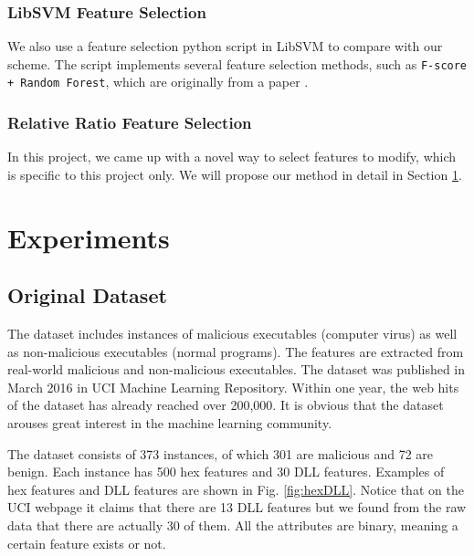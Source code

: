 \documentclass[11pt]{article}
\begin{document}
\subsubsection{LibSVM Feature Selection}
We also use a feature selection python script in LibSVM to compare with our scheme. The script implements several feature selection methods, such as \texttt{F-score + Random Forest}, which are originally from a paper \cite{chen2006combining}. 

\subsubsection{Relative Ratio Feature Selection}
In this project, we came up with a novel way to select features to modify, which is specific to this project only. We will propose our method in detail in Section \ref{sec:exp}.

\section{Experiments}\label{sec:exp}


\subsection{Original Dataset}
The dataset includes instances of malicious executables (computer virus) as well as non-malicious executables (normal programs). The features are extracted from real-world malicious and non-malicious executables. The dataset was published in March 2016 in UCI Machine Learning Repository. Within one year, the web hits of the dataset has already reached over 200,000. It is obvious that the dataset arouses great interest in the machine learning community.

The dataset consists of 373 instances, of which 301 are malicious and 72 are benign. Each instance has 500 hex features and 30 DLL features. Examples of hex features and DLL features are shown in Fig. \ref{fig:hexDLL}. Notice that on the UCI webpage it claims that there are 13 DLL features but we found from the raw data that there are actually 30 of them. All the attributes are binary, meaning a certain feature exists or not. 
\end{document}
